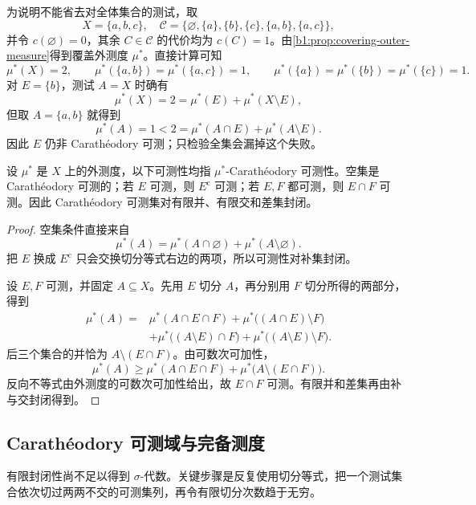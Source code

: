 为说明不能省去对全体集合的测试，取
\[
X=\{a,b,c\},
\quad
\mathcal C=\{\varnothing,\{a\},\{b\},\{c\},\{a,b\},\{a,c\}\},
\]
并令 \(c(\varnothing)=0\)，其余 \(C\in\mathcal C\) 的代价均为 \(c(C)=1\)。由\cref{b1:prop:covering-outer-measure}得到覆盖外测度 \(\mu^*\)。直接计算可知
\[
\mu^*(X)=2,
\qquad
\mu^*(\{a,b\})=\mu^*(\{a,c\})=1,
\qquad
\mu^*(\{a\})=\mu^*(\{b\})=\mu^*(\{c\})=1.
\]
对 \(E=\{b\}\)，测试 \(A=X\) 时确有
\[
\mu^*(X)=2=\mu^*(E)+\mu^*(X\setminus E),
\]
但取 \(A=\{a,b\}\) 就得到
\[
\mu^*(A)=1<2=\mu^*(A\cap E)+\mu^*(A\setminus E).
\]
因此 \(E\) 仍非 Carathéodory 可测；只检验全集会漏掉这个失败。

\begin{proposition}
\label{b1:prop:caratheodory-basic}
设 \(\mu^*\) 是 \(X\) 上的外测度，以下可测性均指 \(\mu^*\)-Carathéodory 可测性。空集是 Carathéodory 可测的；若 \(E\) 可测，则 \(E^{\mathrm c}\) 可测；若 \(E,F\) 都可测，则 \(E\cap F\) 可测。因此 Carathéodory 可测集对有限并、有限交和差集封闭。
\end{proposition}
\begin{proof}
空集条件直接来自
\[
\mu^*(A)=\mu^*(A\cap\varnothing)+\mu^*(A\setminus\varnothing).
\]
把 \(E\) 换成 \(E^{\mathrm c}\) 只会交换切分等式右边的两项，所以可测性对补集封闭。

设 \(E,F\) 可测，并固定 \(A\subseteq X\)。先用 \(E\) 切分 \(A\)，再分别用 \(F\) 切分所得的两部分，得到
\begin{align*}
\mu^*(A)
={}&\mu^*(A\cap E\cap F)
+\mu^*\bigl((A\cap E)\setminus F\bigr)\\
&+\mu^*\bigl((A\setminus E)\cap F\bigr)
+\mu^*\bigl((A\setminus E)\setminus F\bigr).
\end{align*}
后三个集合的并恰为 \(A\setminus(E\cap F)\)。由可数次可加性，
\[
\mu^*(A)
\geq\mu^*(A\cap E\cap F)+\mu^*\bigl(A\setminus(E\cap F)\bigr).
\]
反向不等式由外测度的可数次可加性给出，故 \(E\cap F\) 可测。有限并和差集再由补与交封闭得到。
\end{proof}

\subsection{Carathéodory 可测域与完备测度}
\label{b1:subsec:020303}

有限封闭性尚不足以得到 \(\sigma\)-代数。关键步骤是反复使用切分等式，把一个测试集合依次切过两两不交的可测集列，再令有限切分次数趋于无穷。

